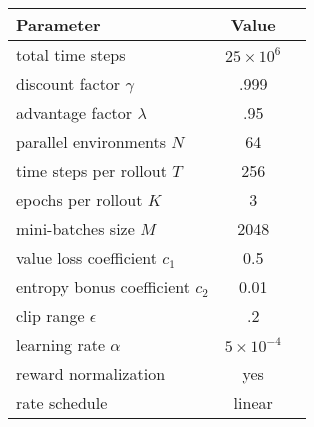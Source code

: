 \begin{tabular}{lcc}
    \toprule
    Parameter & Value \\
    \midrule
    total time steps & \(25 \times 10^6\) \\
    discount factor \(\gamma\) & .999 \\
    advantage factor \(\lambda\) & .95 \\
    parallel environments \(N\) & 64 \\
    time steps per rollout \(T\) & 256 \\
    epochs per rollout \(K\) & 3 \\
    mini-batches size \({M}\) & 2048 \\
    value loss coefficient \(c_1\) & 0.5 \\
    entropy bonus coefficient \(c_2\) & 0.01 \\
    clip range \(\epsilon\) & .2 \\
    learning rate \(\alpha\) & \(5 \times 10^{-4}\) \\
    reward normalization & yes \\
    rate schedule & linear \\
    \bottomrule
\end{tabular}